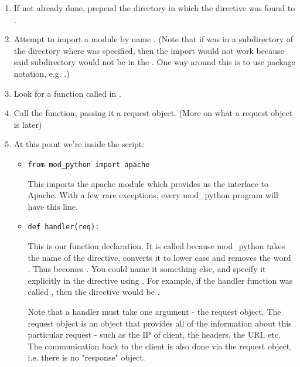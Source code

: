 \begin{enumerate}

\item
If not already done, prepend the directory in which the
 directive was found to .

\item
Attempt to import a module by name . (Note that if
 was in a subdirectory of the directory where
 was specified, then the import would not work
because said subdirectory would not be in the . One way
around this is to use package notation, e.g. .)

\item 
Look for a function called  in .

\item
Call the function, passing it a request object. (More on what a
request object is later)

\item
At this point we're inside the script: 

\begin{itemize}

\item
\begin{verbatim}
from mod_python import apache
\end{verbatim}

This imports the apache module which provides us the interface to
Apache. With a few rare exceptions, every mod_python program will have
this line.

\item
\begin{verbatim}
def handler(req):
\end{verbatim}

 This is our  function declaration. It is
called  because mod_python takes the name of the
directive, converts it to lower case and removes the word
. Thus  becomes
. You could name it something else, and specify it
explicitly in the directive using \samp{::}. For example, if the
handler function was called , then the directive would be
.

Note that a handler must take one argument - the request object. The
request object is an object that provides all of the information about
this particular request - such as the IP of client, the headers, the
URI, etc. The communication back to the client is also done via the
request object, i.e. there is no "response" object.


\end{itemize}
\end{enumerate}
